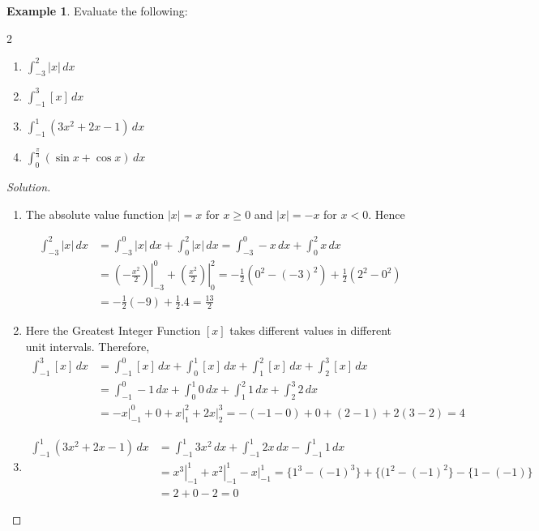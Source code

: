 \documentclass{book}
\theoremstyle{definition}
\newtheorem{example}{Example}[section]
\newenvironment{solution}
    {\begin{proof}[Solution]}
    {\end{proof}}
\begin{document}
\begin{example}
Evaluate the following:
\begin{multicols}{2}
\begin{enumerate}[label=(\roman*)]
    \item $\displaystyle\int _{-3}^{2}|x| \, dx$
    \item $\displaystyle\int_{-1}^3 [x]\,dx$
    \item $\displaystyle\int_{-1}^1 (3x^2+2x-1)\,dx$
    \item $\displaystyle\int_{0}^{\frac{\pi}{3}} (\sin x+\cos x)\,dx$

\end{enumerate}
\end{multicols}    
\end{example}

\begin{solution}
\begin{enumerate}[label=(\roman*)]
\item The absolute value function $|x|=x$ for $x\geq 0$ and $|x|=-x$ for $x < 0$. Hence

\begin{align*}
\int _{-3}^{2}|x| \, dx &= \int _{-3}^{0}|x| \, dx + \int _{0}^{2}|x| \, dx = \int _{-3}^{0}-x \, dx +\int _{0}^{2}x \, dx \\
&= \left.\left(-\frac{x^2}{2}\right)\right\vert_{-3}^0+\left.\left(\frac{x^2}{2}\right)\right\vert_0^2 = -\frac{1}{2}(0^2-(-3)^2)+\frac{1}{2}(2^2-0^2) \\
&= -\frac{1}{2}(-9)+\frac{1}{2}.4 = \frac{13}{2}
\end{align*}


\item Here the Greatest Integer Function $[x]$ takes different values in different unit intervals. Therefore,
\begin{align*}
\int_{-1}^3 [x]\,dx &= \int_{-1}^0 [x]\,dx+ \int_0^1 [x]\,dx+ \int_1^2 [x]\,dx+ \int_2^3 [x]\,dx \\
&= \int_{-1}^0 -1\,dx+ \int_0^1 0\,dx+ \int_1^2 1\,dx+ \int_2^3 2\,dx \\
&= \left.-x\right\vert_{-1}^0+0+\left.x\right\vert_1^2+\left.2x\right\vert_2^3 = -(-1-0)+0+(2-1)+2(3-2)=4
\end{align*}

\item 
\begin{align*}
\int_{-1}^1 (3x^2+2x-1)\,dx &= \int_{-1}^1 3x^2\,dx +\int_{-1}^1 2x\,dx -\int_{-1}^1 1\,dx \\
&= \left.x^3\right\vert_{-1}^1+\left.x^2\right\vert_{-1}^1-\left.x\right\vert_{-1}^1 = \{1^3-(-1)^3\}+\{(1^2-(-1)^2\}-\{1-(-1)\} \\
&= 2+0-2 = 0
\end{align*}


\end{enumerate}
\end{solution}
\end{document}
